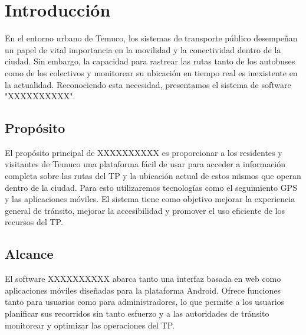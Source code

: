 \documentclass {article}
\begin{document}
\section{Introducción}
En el entorno urbano de Temuco, los sistemas de transporte público desempeñan un papel de vital importancia en la movilidad y la conectividad dentro de la ciudad. Sin embargo, la capacidad para rastrear las rutas tanto de los autobuses como de los colectivos y monitorear su ubicación en tiempo real es inexistente en la actualidad. Reconociendo esta necesidad, presentamos el sistema de software "XXXXXXXXXX".
\subsection{Propósito}
El propósito principal de XXXXXXXXXX es proporcionar a los residentes y visitantes de Temuco una plataforma fácil de usar para acceder a información completa sobre las rutas del TP y la ubicación actual de estos mismos que operan dentro de la ciudad. Para esto utilizaremos tecnologías como el seguimiento GPS y las aplicaciones móviles. El sistema tiene como objetivo mejorar la experiencia general de tránsito, mejorar la accesibilidad y promover el uso eficiente de los recursos del TP.
\subsection{Alcance}
El software XXXXXXXXXX abarca tanto una interfaz basada en web como aplicaciones móviles diseñadas para la plataforma Android. Ofrece funciones tanto para usuarios como para administradores, lo que permite a los usuarios planificar sus recorridos sin tanto esfuerzo y a las autoridades de tránsito monitorear y optimizar las operaciones del TP.
\end{document}
